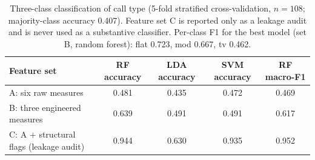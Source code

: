 \begin{table}[!ht]
\centering
\setlength{\tabcolsep}{4pt}
\caption{Three-class classification of call type (5-fold stratified cross-validation,
$n=108$; majority-class accuracy 0.407). Feature set C is reported only as a leakage
audit and is never used as a substantive classifier. Per-class F1 for the best model
(set B, random forest): flat 0.723, mod 0.667, tv 0.462.}
\label{tab:clf}
\scriptsize
\begin{tabular}{lcccc}
\toprule
Feature set & RF accuracy & LDA accuracy & SVM accuracy & RF macro-F1\\
\midrule
A: six raw measures & 0.481 & 0.435 & 0.472 & 0.469\\
B: three engineered measures & 0.639 & 0.491 & 0.491 & 0.617\\
C: A $+$ structural flags (leakage audit) & 0.944 & 0.630 & 0.935 & 0.952\\
\bottomrule
\end{tabular}
\end{table}
